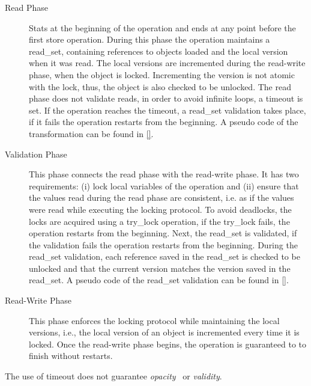 \documentclass{article}
\newcommand{\code}[1]{\textsf{#1}}
\newcommand{\readSet}{\code{read\_set}\xspace}
\begin{document}
\begin{description}
  \item[Read Phase] Stats at the beginning of the operation and
  ends at any point before the first store operation. 
  During this phase the operation maintains a \readSet, 
  containing references to objects loaded and the local 
  version when it was read. The local versions are incremented 
  during the read-write phase, when the object is locked. 
  Incrementing the version is not atomic with the lock, thus, 
  the object is also checked to be unlocked. 
  The read phase does not validate reads, 
  in order to avoid infinite loops, a timeout is set. 
  If the operation reaches the timeout, 
  a \readSet validation takes place, if it fails 
  the operation restarts from the beginning.
  A pseudo code of the transformation can be found in \ref{}. 
  
  \item[Validation Phase] This phase connects the read phase
  with the read-write phase. It has two requirements: (i) lock 
  local variables of the operation and (ii) ensure that the 
  values read during the read phase are consistent, i.e.
  as if the values were read while executing the locking 
  protocol. To avoid deadlocks, the locks are acquired using 
  a \code{try\_lock} operation, if the \code{try\_lock} fails, 
  the operation restarts from the beginning. Next, the \readSet 
  is validated, if the validation fails the operation restarts from the
  beginning. During the \readSet validation, each reference saved 
  in the \readSet is checked to be unlocked and that the current 
  version matches the version saved in the \readSet. 
  A pseudo code of the \readSet validation can be found in \ref{}. 
  
  \item[Read-Write Phase] This phase enforces the locking protocol
  while maintaining the local versions, i.e., the local version of 
  an object is incremented every time it is locked.  
  Once the read-write phase begins, the operation is guaranteed to to 
  finish without restarts.  
\end{description}

The use of timeout does not guarantee
\emph{opacity}~\cite{GuerraouiK2008} or 
\emph{validity}\cite{LevAriCK2014}. 

 
\end{document}
